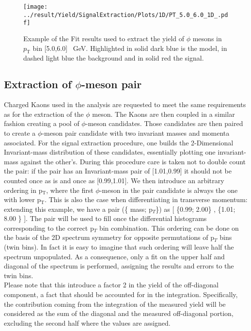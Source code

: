 \begin{figure}
\centering
\texttt{[image: ../result/Yield/SignalExtraction/Plots/1D/PT\_5.0\_6.0\_1D\_.pdf]}
\caption{Example of the Fit results used to extract the yield of $\phi$ mesons in $p_{\text{T}}$ bin [5.0,6.0] \SI{}{\giga\electronvolt}. Highlighted in solid dark blue is the model, in dashed light blue the background and in solid red the signal.}
\label{fig:1Dfit}
\end{figure}

\subsection{Extraction of $\phi$-meson pair}
Charged Kaons used in the analysis are requested to meet the same requirements as for the extraction of the $\phi$ meson. The Kaons are then coupled in a similar fashion creating a pool of $\phi$-meson candidates. Those candidates are then paired to create a $\phi$-meson pair candidate with two invariant masses and momenta associated. For the signal extraction procedure, one builds the 2-Dimensional Invariant-mass distribution of these candidates, essentially plotting one invariant-mass against the other's. During this procedure care is taken not to double count the pair: if the pair has an Invariant-mass pair of [1.01,0.99] it should not be counted once as is and once as [0.99,1.01]. We then introduce an arbitrary ordering in p$_{\text{T}}$, where the first $\phi$-meson in the pair candidate is always the one with lower p$_{\text{T}}$. This is also the case when differentiating in transverse momentum: extending this example, we have a pair (\{ mass; p$_{T}$\}) as  [ \{0.99; 2.00\} , \{1.01; 8.00 \} ]. The pair will be used to fill once the differential histograms corresponding to the correct p$_{T}$ bin combination. This ordering can be done on the basis of the 2D spectrum symmetry for opposite permutations of p$_{T}$ bins (twin bins). In fact it is easy to imagine that such ordering will leave half the spectrum unpopulated. As a consequence, only a fit on the upper half and diagonal of the spectrum is performed, assigning the results and errors to the twin bins.\\
\indent Please note that this introduce a factor 2 in the yield of the off-diagonal component, a fact that should be accounted for in the integration. Specifically, the contribution coming from the integration of the measured yield will be considered as the sum of the diagonal and the measured off-diagonal portion, excluding the second half where the values are assigned.\\
